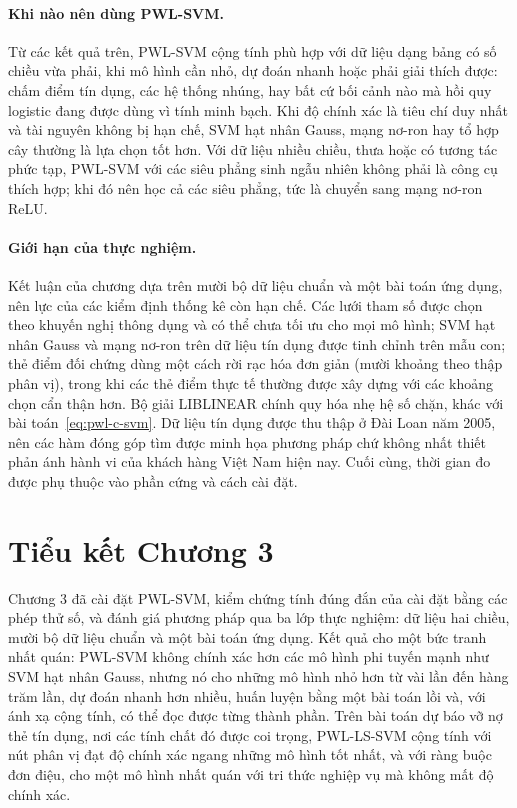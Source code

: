 \paragraph{Khi nào nên dùng PWL-SVM.} Từ các kết quả trên, PWL-SVM cộng tính phù hợp với dữ liệu dạng bảng có số chiều vừa phải, khi mô hình cần nhỏ, dự đoán nhanh hoặc phải giải thích được: chấm điểm tín dụng, các hệ thống nhúng, hay bất cứ bối cảnh nào mà hồi quy logistic đang được dùng vì tính minh bạch. Khi độ chính xác là tiêu chí duy nhất và tài nguyên không bị hạn chế, SVM hạt nhân Gauss, mạng nơ-ron hay tổ hợp cây thường là lựa chọn tốt hơn. Với dữ liệu nhiều chiều, thưa hoặc có tương tác phức tạp, PWL-SVM với các siêu phẳng sinh ngẫu nhiên không phải là công cụ thích hợp; khi đó nên học cả các siêu phẳng, tức là chuyển sang mạng nơ-ron ReLU.

\paragraph{Giới hạn của thực nghiệm.} Kết luận của chương dựa trên mười bộ dữ liệu chuẩn và một bài toán ứng dụng, nên lực của các kiểm định thống kê còn hạn chế. Các lưới tham số được chọn theo khuyến nghị thông dụng và có thể chưa tối ưu cho mọi mô hình; SVM hạt nhân Gauss và mạng nơ-ron trên dữ liệu tín dụng được tinh chỉnh trên mẫu con; thẻ điểm đối chứng dùng một cách rời rạc hóa đơn giản (mười khoảng theo thập phân vị), trong khi các thẻ điểm thực tế thường được xây dựng với các khoảng chọn cẩn thận hơn. Bộ giải LIBLINEAR chính quy hóa nhẹ hệ số chặn, khác với bài toán~\eqref{eq:pwl-c-svm}. Dữ liệu tín dụng được thu thập ở Đài Loan năm 2005, nên các hàm đóng góp tìm được minh họa phương pháp chứ không nhất thiết phản ánh hành vi của khách hàng Việt Nam hiện nay. Cuối cùng, thời gian đo được phụ thuộc vào phần cứng và cách cài đặt.

\section*{Tiểu kết Chương 3}

Chương 3 đã cài đặt PWL-SVM, kiểm chứng tính đúng đắn của cài đặt bằng các phép thử số, và đánh giá phương pháp qua ba lớp thực nghiệm: dữ liệu hai chiều, mười bộ dữ liệu chuẩn và một bài toán ứng dụng. Kết quả cho một bức tranh nhất quán: PWL-SVM không chính xác hơn các mô hình phi tuyến mạnh như SVM hạt nhân Gauss, nhưng nó cho những mô hình nhỏ hơn từ vài lần đến hàng trăm lần, dự đoán nhanh hơn nhiều, huấn luyện bằng một bài toán lồi và, với ánh xạ cộng tính, có thể đọc được từng thành phần. Trên bài toán dự báo vỡ nợ thẻ tín dụng, nơi các tính chất đó được coi trọng, PWL-LS-SVM cộng tính với nút phân vị đạt độ chính xác ngang những mô hình tốt nhất, và với ràng buộc đơn điệu, cho một mô hình nhất quán với tri thức nghiệp vụ mà không mất độ chính xác.
